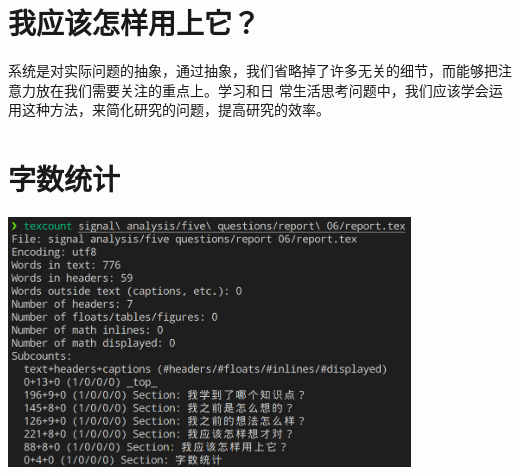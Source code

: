 \documentclass{ctexart}
\begin{document}
    \section{我应该怎样用上它？}

    系统是对实际问题的抽象，通过抽象，我们省略掉了许多无关的细节，而能够把注意力放在我们需要关注的重点上。学习和日
    常生活思考问题中，我们应该学会运用这种方法，来简化研究的问题，提高研究的效率。

    \section*{字数统计}

    \begin{center}
        \includegraphics[width=0.8\textwidth]{pics/texcount.png}
    \end{center}
\end{document}
